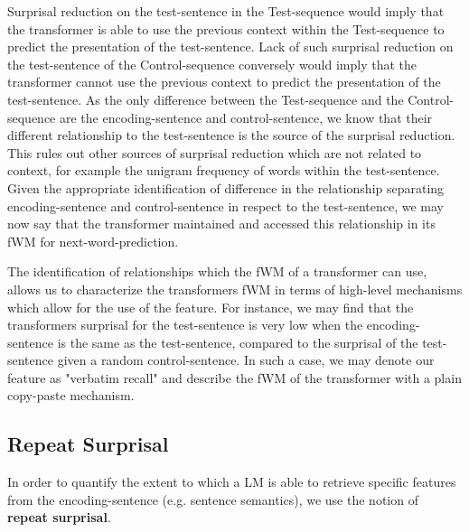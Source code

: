 Surprisal reduction on the test-sentence in the Test-sequence would imply that the transformer is able to use the previous context within the Test-sequence to predict the presentation of the test-sentence.
Lack of such surprisal reduction on the test-sentence of the Control-sequence conversely would imply that the transformer cannot use the previous context to predict the presentation of the test-sentence.
As the only difference between the Test-sequence and the Control-sequence are the encoding-sentence and control-sentence, we know that their different relationship to the test-sentence is the source of the surprisal reduction.
This rules out other sources of surprisal reduction which are not related to context, for example the unigram frequency of words within the test-sentence.
Given the appropriate identification of difference in the relationship separating encoding-sentence and control-sentence in respect to the test-sentence, we may now say that the transformer maintained and accessed this relationship in its fWM for next-word-prediction.

The identification of relationships which the fWM of a transformer can use, allows us to characterize the transformers fWM in terms of high-level mechanisms which allow for the use of the feature.
For instance, we may find that the transformers surprisal for the test-sentence is very low when the encoding-sentence is the same as the test-sentence, compared to the surprisal of the test-sentence given a random control-sentence. In such a case, we may denote our feature as "verbatim recall" and describe the fWM of the transformer with a plain copy-paste mechanism.


\subsection{Repeat Surprisal}\label{ch:rs}
In order to quantify the extent to which a LM is able to retrieve specific features from the encoding-sentence (e.g. sentence semantics), we use the notion of \textbf{repeat surprisal}.

